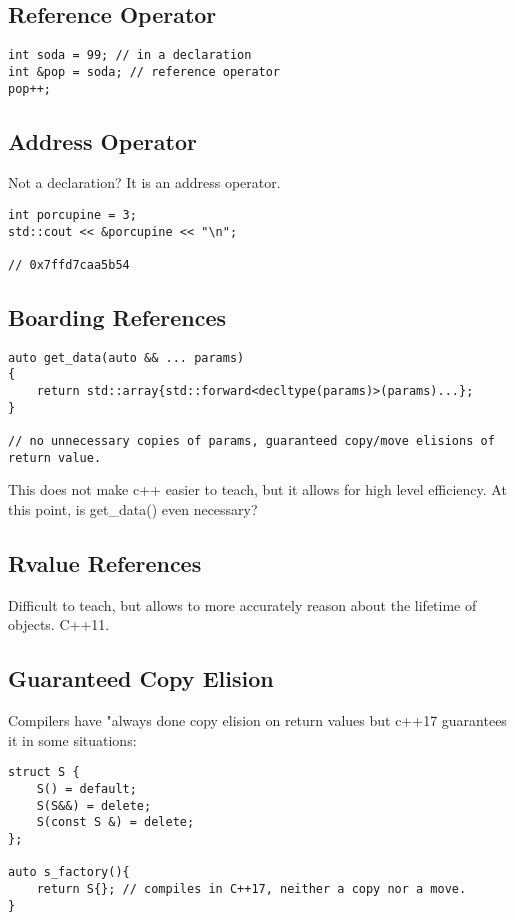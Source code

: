 \subsection{Reference Operator}

\begin{verbatim}
int soda = 99; // in a declaration
int &pop = soda; // reference operator
pop++;
\end{verbatim}

\subsection{Address Operator}

Not a declaration? It is an address operator.

\begin{verbatim}
int porcupine = 3; 
std::cout << &porcupine << "\n"; 

// 0x7ffd7caa5b54
\end{verbatim}

\subsection{Boarding References}

\begin{verbatim}
auto get_data(auto && ... params)
{
    return std::array{std::forward<decltype(params)>(params)...};
}

// no unnecessary copies of params, guaranteed copy/move elisions of return value.
\end{verbatim}

This does not make c++ easier to teach, but it allows for high level efficiency. At this point, 
is get\_data() even necessary?

\subsection{Rvalue References}

Difficult to teach, but allows to more accurately reason about the lifetime of objects. C++11.

\subsection{Guaranteed Copy Elision}

Compilers have "always done copy elision on return values but c++17 guarantees it in some situations:

\begin{verbatim}
struct S {
    S() = default;
    S(S&&) = delete;
    S(const S &) = delete;
};

auto s_factory(){
    return S{}; // compiles in C++17, neither a copy nor a move.
}
\end{verbatim}

